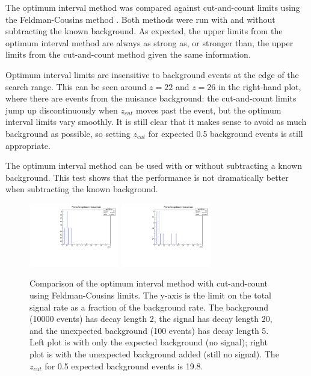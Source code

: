 The optimum interval method was compared against cut-and-count limits using the Feldman-Cousins method \cite{feldman_unified_1998}.
Both methods were run with and without subtracting the known background.
As expected, the upper limits from the optimum interval method are always as strong as, or stronger than, the upper limits from the cut-and-count method given the same information.

Optimum interval limits are insensitive to background events at the edge of the search range.
This can be seen around $z=22$ and $z=26$ in the right-hand plot, where there are events from the nuisance background: the cut-and-count limits jump up discontinuously when $z_{cut}$ moves past the event, but the optimum interval limits vary smoothly.
It is still clear that it makes sense to avoid as much background as possible, so setting $z_{cut}$ for expected 0.5 background events is still appropriate.

The optimum interval method can be used with or without subtracting a known background.
This test shows that the performance is not dramatically better when subtracting the known background.

\begin{figure}[ht]
\begin{center}
    \includegraphics[width=0.35\textwidth,page=6,angle=-90]{vertexing/figs/toy_nothing}
    \includegraphics[width=0.35\textwidth,page=6,angle=-90]{vertexing/figs/toy_nosignal}
\end{center}
    \caption{Comparison of the optimum interval method with cut-and-count using Feldman-Cousins limits. The y-axis is the limit on the total signal rate as a fraction of the background rate. 
        The background (10000 events) has decay length 2, the signal has decay length 20, and the unexpected background (100 events) has decay length 5. Left plot is with only the expected background (no signal); right plot is with the unexpected background added (still no signal). The $z_{cut}$ for 0.5 expected background events is 19.8.}
    \label{fig:optimum_interval_demo}
\end{figure}

